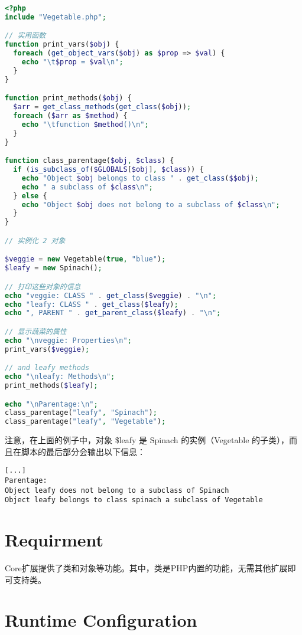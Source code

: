 \begin{lstlisting}[language=PHP]
<?php
include "Vegetable.php";

// 实用函数
function print_vars($obj) {
  foreach (get_object_vars($obj) as $prop => $val) {
    echo "\t$prop = $val\n";
  }
}

function print_methods($obj) {
  $arr = get_class_methods(get_class($obj));
  foreach ($arr as $method) {
    echo "\tfunction $method()\n";
  }
}

function class_parentage($obj, $class) {
  if (is_subclass_of($GLOBALS[$obj], $class)) {
    echo "Object $obj belongs to class " . get_class($$obj);
    echo " a subclass of $class\n";
  } else {
    echo "Object $obj does not belong to a subclass of $class\n";
  }
}

// 实例化 2 对象

$veggie = new Vegetable(true, "blue");
$leafy = new Spinach();

// 打印这些对象的信息
echo "veggie: CLASS " . get_class($veggie) . "\n";
echo "leafy: CLASS " . get_class($leafy);
echo ", PARENT " . get_parent_class($leafy) . "\n";

// 显示蔬菜的属性
echo "\nveggie: Properties\n";
print_vars($veggie);

// and leafy methods
echo "\nleafy: Methods\n";
print_methods($leafy);

echo "\nParentage:\n";
class_parentage("leafy", "Spinach");
class_parentage("leafy", "Vegetable");
\end{lstlisting}

注意，在上面的例子中，对象 \$leafy 是 Spinach 的实例（Vegetable 的子类），而且在脚本的最后部分会输出以下信息：


\begin{lstlisting}
[...]
Parentage:
Object leafy does not belong to a subclass of Spinach
Object leafy belongs to class spinach a subclass of Vegetable
\end{lstlisting}


\section{Requirment}

Core扩展提供了类和对象等功能。其中，类是PHP内置的功能，无需其他扩展即可支持类。




\section{Runtime Configuration}

